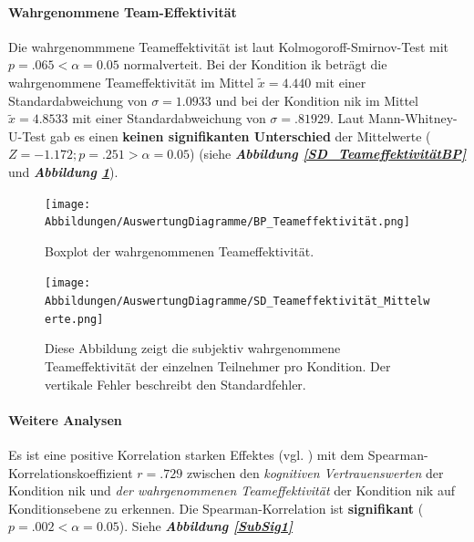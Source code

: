 \documentclass[a4paper,11pt]{article}%
\renewcommand{\\}{\vspace*{0.5\baselineskip} \newline}
\begin{document}
\paragraph{Wahrgenommene Team-Effektivität}
Die wahrgenommmene Teameffektivität ist laut Kolmogoroff-Smirnov-Test mit $p = .065 < \alpha = 0.05$ normalverteit. 
Bei der Kondition \ac{ik} beträgt die wahrgenommene Teameffektivität im Mittel $\tilde x = 4.440$ mit einer Standardabweichung von $\sigma = 1.0933$ und bei der Kondition \ac{nik} im Mittel $\tilde x = 4.8533$ mit einer Standardabweichung von $\sigma = .81929$. 
Laut Mann-Whitney-U-Test gab es einen \textbf{keinen signifikanten Unterschied} der Mittelwerte ($ Z = -1.172; p = .251 > \alpha = 0.05$) (siehe \textbf{\textit{Abbildung \ref{SD_TeameffektivitätBP}}} und \textbf{\textit{Abbildung \ref{SD_Teameffektivität_Mittelwerte}}}).

		\begin{figure}[H]
   \begin{minipage}[t]{.5\linewidth} %
      \texttt{[image: Abbildungen/AuswertungDiagramme/BP\_Teameffektivität.png]}
      \caption[Boxplot der wahrgenommenen Teameffektivität]{Boxplot der wahrgenommenen Teameffektivität.}
            \label{SD_TeameffektivitätBP}
   \end{minipage}
   \hspace{.02\linewidth}%
   \begin{minipage}[t]{.5\linewidth} %
     \texttt{[image: Abbildungen/AuswertungDiagramme/SD\_Teameffektivität\_Mittelwerte.png]}
      \caption[Durchschnittlich wahrgenommene Teamkommunikation]{Diese Abbildung zeigt die subjektiv wahrgenommene Teameffektivität der einzelnen Teilnehmer pro Kondition. Der vertikale Fehler beschreibt den Standardfehler.}
       \label{SD_Teameffektivität_Mittelwerte}
   \end{minipage}
\end{figure}


\paragraph{Weitere Analysen}
Es ist eine positive Korrelation starken Effektes (vgl. \citep{cohen2013statistical}) mit dem Spearman-Korrelationskoeffizient $r = .729$ zwischen den \textit{kognitiven Vertrauenswerten} der Kondition \ac{nik} und \textit{der wahrgenommenen Teameffektivität} der Kondition \ac{nik} auf Konditionsebene zu erkennen. Die Spearman-Korrelation ist \textbf{signifikant} ($p = .002 < \alpha = 0.05$). Siehe \textbf{\textit{Abbildung \ref{SubSig1}}}\\
\end{document}
